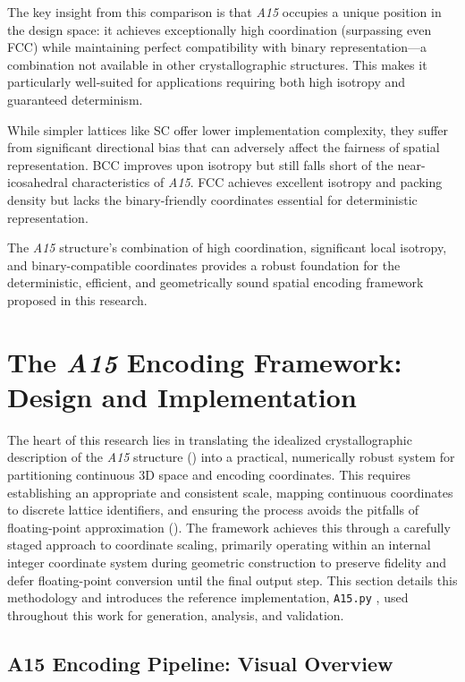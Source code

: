 \documentclass[10pt]{article}
\def\AAAB{\textit{A15}}
\begin{document}
The key insight from this comparison is that \AAAB{} occupies a unique position in the design space: it achieves exceptionally high coordination (surpassing even FCC) while maintaining perfect compatibility with binary representation—a combination not available in other crystallographic structures. This makes it particularly well-suited for applications requiring both high isotropy and guaranteed determinism.

While simpler lattices like SC offer lower implementation complexity, they suffer from significant directional bias that can adversely affect the fairness of spatial representation. BCC improves upon isotropy but still falls short of the near-icosahedral characteristics of \AAAB{}. FCC achieves excellent isotropy and packing density but lacks the binary-friendly coordinates essential for deterministic representation.

The \AAAB{} structure's combination of high coordination, significant local isotropy, and binary-compatible coordinates provides a robust foundation for the deterministic, efficient, and geometrically sound spatial encoding framework proposed in this research.

\section{The \AAAB{} Encoding Framework: Design and Implementation}\label{sec-framework-design}

The heart of this research lies in translating the idealized crystallographic description of the \AAAB{} structure () into a practical, numerically robust system for partitioning continuous 3D space and encoding coordinates. This requires establishing an appropriate and consistent scale, mapping continuous coordinates to discrete lattice identifiers, and ensuring the process avoids the pitfalls of floating-point approximation (). The framework achieves this through a carefully staged approach to coordinate scaling, primarily operating within an internal integer coordinate system during geometric construction to preserve fidelity and defer floating-point conversion until the final output step. This section details this methodology and introduces the reference implementation, \texttt{A15.py} \cite{Risinger2024A15}, used throughout this work for generation, analysis, and validation.

\subsection{A15 Encoding Pipeline: Visual Overview}
\label{sec-visual-overview}
\end{document}
